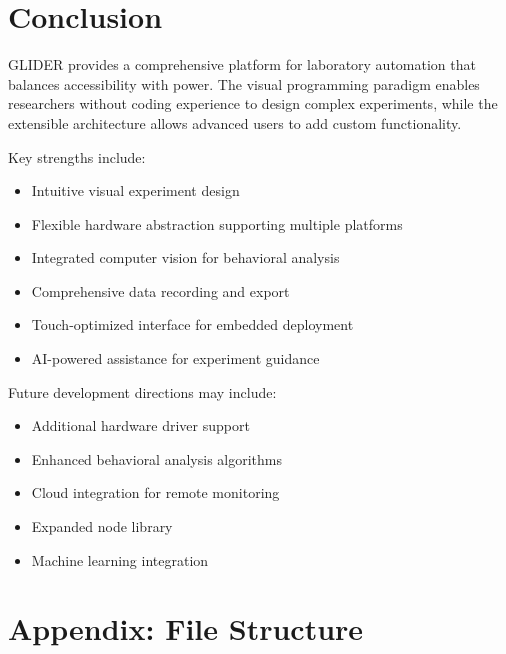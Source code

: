 \documentclass[11pt,a4paper]{article}
\begin{document}
\section{Conclusion}

GLIDER provides a comprehensive platform for laboratory automation that balances accessibility with power. The visual programming paradigm enables researchers without coding experience to design complex experiments, while the extensible architecture allows advanced users to add custom functionality.

Key strengths include:
\begin{itemize}    \item Intuitive visual experiment design
    \item Flexible hardware abstraction supporting multiple platforms
    \item Integrated computer vision for behavioral analysis
    \item Comprehensive data recording and export
    \item Touch-optimized interface for embedded deployment
    \item AI-powered assistance for experiment guidance
\end{itemize}

Future development directions may include:
\begin{itemize}    \item Additional hardware driver support
    \item Enhanced behavioral analysis algorithms
    \item Cloud integration for remote monitoring
    \item Expanded node library
    \item Machine learning integration
\end{itemize}

\appendix
\section{Appendix: File Structure}
\end{document}
